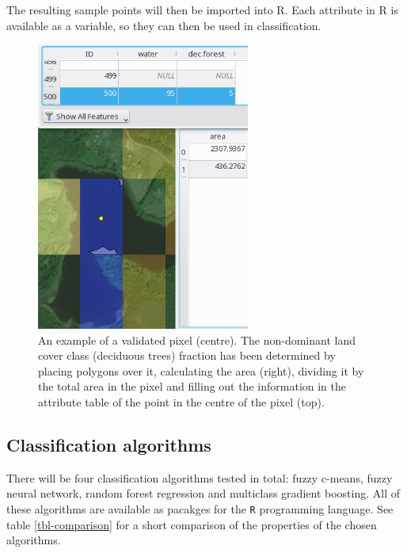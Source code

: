 \documentclass[a4paper,10pt]{article}
\begin{document}
The resulting sample points will then be imported into R. Each attribute in R is available as a variable, so they can then be used in classification.

\begin{figure}
 \centering
 \includegraphics[width=7cm]{./proposal-figures/procedureexample.png}
 \caption{An example of a validated pixel (centre). The non-dominant land cover class (deciduous trees) fraction has been determined by placing polygons over it, calculating the area (right), dividing it by the total area in the pixel and filling out the information in the attribute table of the point in the centre of the pixel (top).}
 \label{fig-procedure}
\end{figure}

\subsection{Classification algorithms}

There will be four classification algorithms tested in total: fuzzy c-means, fuzzy neural network, random forest regression and multiclass gradient boosting. All of these algorithms are available as pacakges for the \texttt{R} programming language. See table \ref{tbl-comparison} for a short comparison of the properties of the chosen algorithms.
\end{document}
